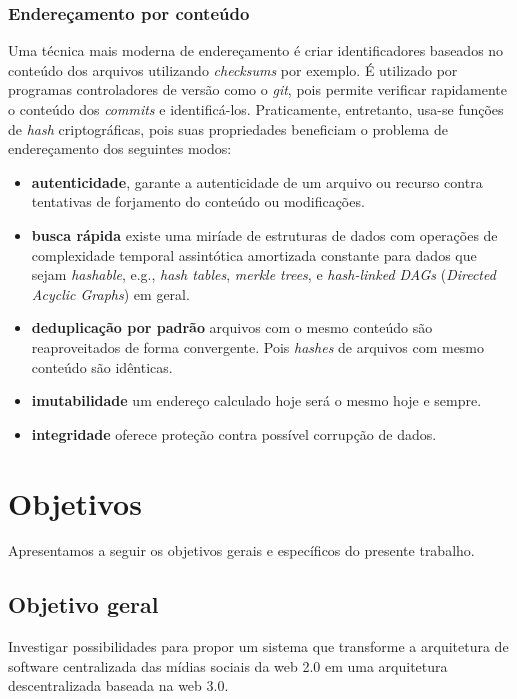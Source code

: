 \subsection{Endereçamento por conteúdo}

Uma técnica mais moderna de endereçamento é criar identificadores baseados no conteúdo dos arquivos utilizando \textit{checksums} por exemplo.
É utilizado por programas controladores de versão como o \textit{git}, pois permite verificar rapidamente o conteúdo dos \textit{commits} e identificá-los.
Praticamente, entretanto, usa-se funções de \textit{hash} criptográficas, pois suas propriedades beneficiam o problema de endereçamento dos seguintes modos:

\begin{itemize}
    \item \textbf{autenticidade}, garante a autenticidade de um arquivo ou recurso contra tentativas de forjamento do conteúdo ou modificações.
    \item \textbf{busca rápida} existe uma miríade de estruturas de dados com operações de complexidade temporal assintótica amortizada constante para dados que sejam \textit{hashable}, e.g., \textit{hash tables}, \textit{merkle trees}, e \textit{hash-linked DAGs} (\textit{Directed Acyclic Graphs}) em geral.
    \item \textbf{deduplicação por padrão} arquivos com o mesmo conteúdo são reaproveitados de forma convergente.
          Pois \textit{hashes} de arquivos com mesmo conteúdo são idênticas.
    \item \textbf{imutabilidade} um endereço calculado hoje será o mesmo hoje e sempre.
    \item \textbf{integridade} oferece proteção contra possível corrupção de dados.
\end{itemize}

\chapter{Objetivos}

Apresentamos a seguir os objetivos gerais e específicos do presente trabalho.

\section{Objetivo geral}

 Investigar possibilidades para propor um sistema que transforme a arquitetura de software centralizada das mídias sociais da web 2.0 em uma arquitetura descentralizada baseada na web 3.0.

